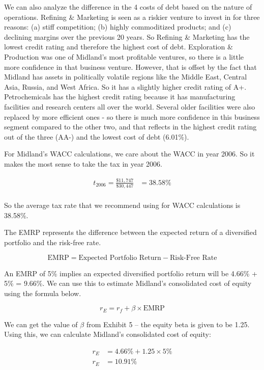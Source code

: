 \documentclass[letterpaper]{article}
\begin{document}
We can also analyze the difference in the 4 costs of debt based on the nature of operations. Refining \& Marketing is seen as a riskier venture to invest in for three reasons: (a) stiff competition; (b) highly commoditized products; and (c) declining margins over the previous 20 years. So Refining \& Marketing has the lowest credit rating and therefore the highest cost of debt. Exploration \& Production was one of Midland's most profitable ventures, so there is a little more confidence in that business venture. However, that is offset by the fact that Midland has assets in politically volatile regions like the Middle East, Central Asia, Russia, and West Africa. So it has a slightly higher credit rating of A+. Petrochemicals has the highest credit rating because it has manufacturing facilities and research centers all over the world. Several older facilities were also replaced by more efficient ones - so there is much more confidence in this business segment compared to the other two, and that reflects in the highest credit rating out of the three (AA-) and the lowest cost of debt (6.01\%).

For Midland's WACC calculations, we care about the WACC in year 2006. So it makes the most sense to take the tax in year 2006.

\begin{align*}
    t_{2006} = \frac{\$11,747}{\$30,447} &= 38.58\% \\
\end{align*}

So the average tax rate that we recommend using for WACC calculations is 38.58\%.

The EMRP represents the difference between the expected return of a diversified portfolio and the risk-free rate. 

\[
\text{EMRP} = \text{Expected Portfolio Return} - \text{Risk-Free Rate}
\]

An EMRP of 5\% implies an expected diversified portfolio return will be 4.66\% + 5\% = 9.66\%. We can use this to estimate Midland's consolidated cost of equity using the formula below.

\[
r_E = r_f + \beta \times \text{EMRP}
\]

We can get the value of $\beta$ from Exhibit 5 -- the equity beta is given to be 1.25. Using this, we can calculate Midland's consolidated cost of equity:

\begin{align*}
r_E &= 4.66\% + 1.25 \times 5\% \\
r_E &= 10.91\%
\end{align*}
\end{document}
